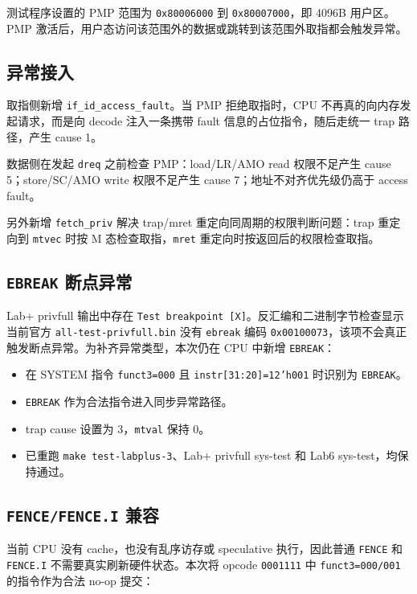 \documentclass[UTF8,a4paper,11pt]{ctexart}
\begin{document}
测试程序设置的 PMP 范围为 \texttt{0x80006000} 到 \texttt{0x80007000}，即 4096B 用户区。PMP 激活后，用户态访问该范围外的数据或跳转到该范围外取指都会触发异常。

\subsection{异常接入}

取指侧新增 \texttt{if\_id\_access\_fault}。当 PMP 拒绝取指时，CPU 不再真的向内存发起请求，而是向 decode 注入一条携带 fault 信息的占位指令，随后走统一 trap 路径，产生 cause 1。

数据侧在发起 \texttt{dreq} 之前检查 PMP：load/LR/AMO read 权限不足产生 cause 5；store/SC/AMO write 权限不足产生 cause 7；地址不对齐优先级仍高于 access fault。

另外新增 \texttt{fetch\_priv} 解决 trap/mret 重定向同周期的权限判断问题：trap 重定向到 \texttt{mtvec} 时按 M 态检查取指，\texttt{mret} 重定向时按返回后的权限检查取指。

\subsection{\texttt{EBREAK} 断点异常}

Lab+ privfull 输出中存在 \texttt{Test breakpoint [X]}。反汇编和二进制字节检查显示当前官方 \texttt{all-test-privfull.bin} 没有 \texttt{ebreak} 编码 \texttt{0x00100073}，该项不会真正触发断点异常。为补齐异常类型，本次仍在 CPU 中新增 \texttt{EBREAK}：

\begin{itemize}
  \item 在 SYSTEM 指令 \texttt{funct3=000} 且 \texttt{instr[31:20]=12'h001} 时识别为 \texttt{EBREAK}。
  \item \texttt{EBREAK} 作为合法指令进入同步异常路径。
  \item trap cause 设置为 3，\texttt{mtval} 保持 0。
  \item 已重跑 \texttt{make test-labplus-3}、Lab+ privfull sys-test 和 Lab6 sys-test，均保持通过。
\end{itemize}

\subsection{\texttt{FENCE/FENCE.I} 兼容}

当前 CPU 没有 cache，也没有乱序访存或 speculative 执行，因此普通 \texttt{FENCE} 和 \texttt{FENCE.I} 不需要真实刷新硬件状态。本次将 opcode \texttt{0001111} 中 \texttt{funct3=000/001} 的指令作为合法 no-op 提交：
\end{document}
